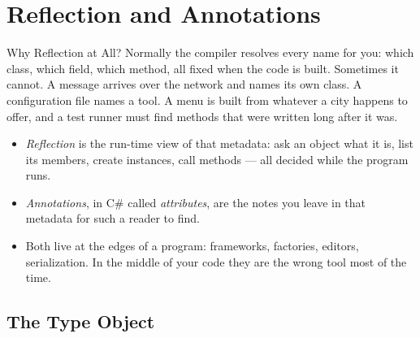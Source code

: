 
\section{Reflection and Annotations}



\begin{frame}{Why Reflection at All?}
  Normally the compiler resolves every name for you: which class, which field,
  which method, all fixed when the code is built. Sometimes it cannot. A
  message arrives over the network and names its own class. A configuration
  file names a tool. A menu is built from whatever a city happens to offer, and
  a test runner must find methods that were written long after it was.
  \vspace{1ex}

  \begin{itemize}
    \item \emph{Reflection} is the run-time view of that metadata: ask an
      object what it is, list its members, create instances, call methods ---
      all decided while the program runs.
    \item \emph{Annotations}, in C\# called \emph{attributes}, are the notes
      you leave in that metadata for such a reader to find.
    \item Both live at the edges of a program: frameworks, factories, editors,
      serialization. In the middle of your code they are the wrong tool most
      of the time.
  \end{itemize}
  \vspace{2ex}

\end{frame}

\subsection{The Type Object}

